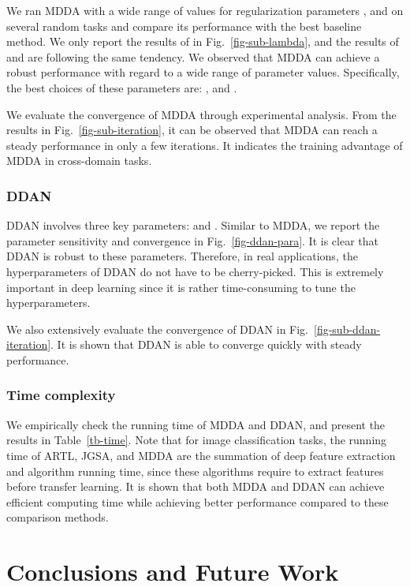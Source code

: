 \documentclass[acmsmall]{acmart}
\begin{document}
We ran MDDA with a wide range of values for regularization parameters , and  on several random tasks and compare its performance with the best baseline method. We only report the results of  in Fig.~\ref{fig-sub-lambda}, and the results of  and  are following the same tendency. We observed that MDDA can achieve a robust performance with regard to a wide range of parameter values. Specifically, the best choices of these parameters are: , and .

We evaluate the convergence of MDDA through experimental analysis. From the results in Fig.~\ref{fig-sub-iteration}, it can be observed that MDDA can reach a steady performance in only a few  iterations. It indicates the training advantage of MDDA in cross-domain tasks.

\subsubsection{DDAN}

DDAN involves three key parameters:  and . Similar to MDDA, we report the parameter sensitivity and convergence in Fig.~\ref{fig-ddan-para}. It is clear that DDAN is robust to these parameters. Therefore, in real applications, the hyperparameters of DDAN do not have to be cherry-picked. This is extremely important in deep learning since it is rather time-consuming to tune the hyperparameters.

We also extensively evaluate the convergence of DDAN in Fig.~\ref{fig-sub-ddan-iteration}. It is shown that DDAN is able to converge quickly with steady performance.

\subsubsection{Time complexity}

We empirically check the running time of MDDA and DDAN, and present the results in Table~\ref{tb-time}. Note that for image classification tasks, the running time of ARTL, JGSA, and MDDA are the summation of deep feature extraction and algorithm running time, since these algorithms require to extract features before transfer learning. It is shown that both MDDA and DDAN can achieve efficient computing time while achieving better performance compared to these comparison methods.






\section{Conclusions and Future Work}
\label{sec-con}
\end{document}
